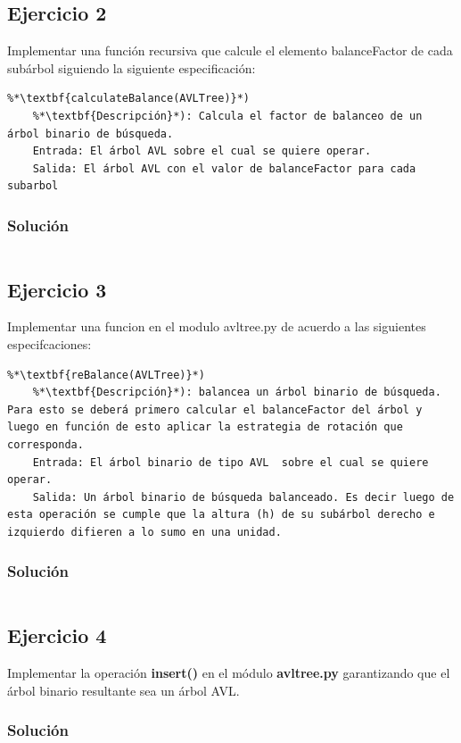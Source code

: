 \documentclass{article}
\begin{document}
\subsection*{Ejercicio 2}
Implementar una función recursiva que calcule el elemento balanceFactor de cada subárbol siguiendo la siguiente especificación:
\begin{lstlisting}
%*\textbf{calculateBalance(AVLTree)}*)
    %*\textbf{Descripción}*): Calcula el factor de balanceo de un árbol binario de búsqueda.
    Entrada: El árbol AVL sobre el cual se quiere operar.
    Salida: El árbol AVL con el valor de balanceFactor para cada subarbol
\end{lstlisting}
\subsubsection*{Solución}
\inputminted{python3}{./code/snippets/ejercicio2.py}


\subsection*{Ejercicio 3}
Implementar una funcion en el modulo avltree.py de acuerdo a  las siguientes especifcaciones:

\begin{lstlisting}
%*\textbf{reBalance(AVLTree)}*)
    %*\textbf{Descripción}*): balancea un árbol binario de búsqueda. Para esto se deberá primero calcular el balanceFactor del árbol y luego en función de esto aplicar la estrategia de rotación que corresponda.
    Entrada: El árbol binario de tipo AVL  sobre el cual se quiere operar.
    Salida: Un árbol binario de búsqueda balanceado. Es decir luego de esta operación se cumple que la altura (h) de su subárbol derecho e izquierdo difieren a lo sumo en una unidad.
\end{lstlisting}
\subsubsection*{Solución}
\setlength{\fboxsep}{0pt}
\inputminted{python3}{./code/snippets/ejercicio3.py}


\subsection*{Ejercicio 4}
Implementar la operación \textbf{insert()} en  el módulo \textbf{avltree.py} garantizando que el árbol  binario resultante sea un árbol AVL. 
\subsubsection*{Solución}
\inputminted{python3}{./code/snippets/ejercicio4.py}
\end{document}
